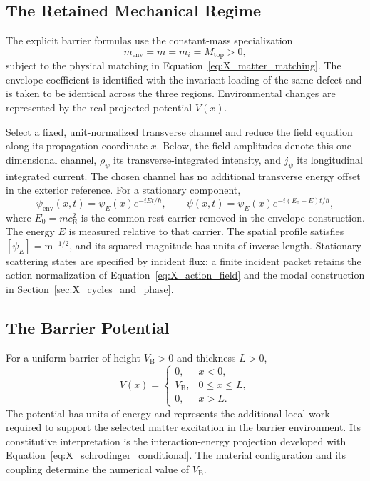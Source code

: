 \subsection{The Retained Mechanical Regime}

The explicit barrier formulas use the constant-mass specialization
\begin{equation}
    m_{\mathrm{env}}=m=m_i=M_{\mathrm{top}}>0,
\end{equation}
subject to the physical matching in Equation~\eqref{eq:X_matter_matching}. The envelope coefficient is identified with the invariant loading of the same defect and is taken to be identical across the three regions. Environmental changes are represented by the real projected potential $V(x)$.

Select a fixed, unit-normalized transverse channel and reduce the field equation along its propagation coordinate $x$. Below, the field amplitudes denote this one-dimensional channel, $\rho_\psi$ its transverse-integrated intensity, and $j_\psi$ its longitudinal integrated current. The chosen channel has no additional transverse energy offset in the exterior reference. For a stationary component,
\begin{equation}
    \psi_{\mathrm{env}}(x,t)
    =\psi_E(x)e^{-iEt/\hbar},
    \qquad
    \psi(x,t)=\psi_E(x)e^{-i(E_0+E)t/\hbar},
    \label{eq:tunneling_stationary_ansatz}
\end{equation}
where $E_0=mc_{\mathrm E}^2$ is the common rest carrier removed in the envelope construction. The energy $E$ is measured relative to that carrier. The spatial profile satisfies $[\psi_E]=\mathrm m^{-1/2}$, and its squared magnitude has units of inverse length. Stationary scattering states are specified by incident flux; a finite incident packet retains the action normalization of Equation~\eqref{eq:X_action_field} and the modal construction in \hyperref[sec:X_cycles_and_phase]{Section~\ref*{sec:X_cycles_and_phase}}.

\subsection{The Barrier Potential}

For a uniform barrier of height $V_{\mathrm B}>0$ and thickness $L>0$,
\begin{equation}
    \boxed{
    V(x)=
    \begin{cases}
        0, & x<0,\\[1mm]
        V_{\mathrm B}, & 0\leq x\leq L,\\[1mm]
        0, & x>L.
    \end{cases}
    }
    \label{eq:tunneling_barrier_profile}
\end{equation}
The potential has units of energy and represents the additional local work required to support the selected matter excitation in the barrier environment. Its constitutive interpretation is the interaction-energy projection developed with Equation~\eqref{eq:X_schrodinger_conditional}. The material configuration and its coupling determine the numerical value of $V_{\mathrm B}$.

